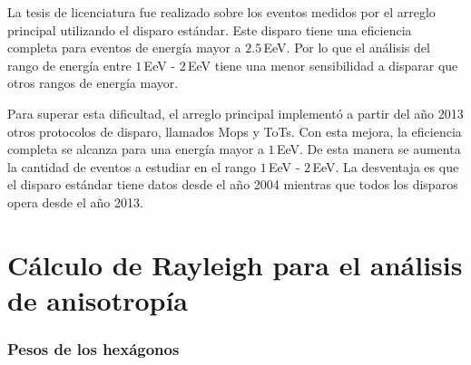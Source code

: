 La tesis de licenciatura fue realizado sobre los eventos medidos por el arreglo principal utilizando el disparo estándar. Este disparo tiene una eficiencia completa para eventos de energía mayor a $2.5\,$EeV. Por lo que el análisis del rango de energía entre $1\,$EeV - $2\,$EeV tiene una menor sensibilidad a disparar que otros rangos de energía mayor.

Para superar esta dificultad, el arreglo principal implementó a partir del año 2013 otros protocolos de disparo, llamados Mops y ToTs. Con esta mejora, la eficiencia completa se alcanza para una energía mayor a $1\,$EeV. De esta manera se aumenta la cantidad de eventos a estudiar en el rango $1\,$EeV - $2\,$EeV. La desventaja es que el disparo estándar tiene datos desde el año 2004 mientras que todos los disparos opera desde el año 2013.
   

\section{Cálculo de Rayleigh para el análisis de anisotropía}

  \subsubsection{Pesos de los hexágonos} \label{peso_hexagonos}

